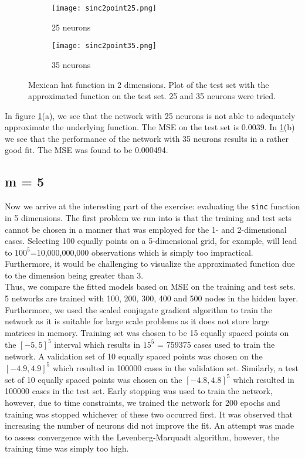 \documentclass[paper=a4, fontsize=11pt]{scrartcl} %
\numberwithin{equation}{section} %
\begin{document}
\begin{figure}[h]
	\begin{subfigure}{0.5\linewidth}
		\centering
		\texttt{[image: sinc2point25.png]}
		\caption{25 neurons}
	\end{subfigure}
	\begin{subfigure}{0.5\linewidth}
		\centering
		\texttt{[image: sinc2point35.png]}
		\caption{35 neurons}
	\end{subfigure}
\caption{Mexican hat function in 2 dimensions. Plot of the test set with the approximated function on the test set. 25 and 35 neurons were tried.}
\label{sinc2fit}
\end{figure}

In figure \ref{sinc2fit}(a), we see that the network with 25 neurons is not able to adequately approximate the underlying function. The MSE on the test set  is 0.0039. In \ref{sinc2fit}(b) we see that the performance of the network with 35 neurons results in a rather good fit. The MSE was found to be 0.000494.

\subsection{m = 5}
Now we arrive at the interesting part of the exercise: evaluating the \texttt{sinc} function in 5 dimensions. The first problem we run into is that the training and test sets cannot be chosen in a manner that was employed for the 1- and 2-dimensional cases. Selecting 100 equally points on a 5-dimensional grid, for example, will lead to $100^5$=10,000,000,000 observations which is simply too impractical. Furthermore, it would be challenging to visualize the approximated function due to the dimension being greater than 3.\\ 

Thus, we compare the fitted models based on MSE on the training and test sets. 5 networks are trained with 100, 200, 300, 400 and 500 nodes in the hidden layer. Furthermore, we used the scaled conjugate gradient algorithm to train the network as it is suitable for large scale problems as it does not store large matrices in memory. Training set was chosen to be 15 equally spaced points on the $[-5,5]^5$ interval which results in $15^5$ = 759375 cases used to train the network. A validation set of 10 equally spaced points was chosen on the $[-4.9,4.9]^5$ which resulted in 100000 cases in the validation set. Similarly, a test set of 10 equally spaced points was chosen on the $[-4.8,4.8]^5$ which resulted in 100000 cases in the test set. Early stopping was used to train the network, however, due to time constraints, we trained the network for 200 epochs and training was stopped whichever of these two occurred first. It was observed that increasing the number of neurons did not improve the fit. An attempt was made to assess convergence with the Levenberg-Marquadt algorithm, however, the training time was simply too high.\\
\end{document}
